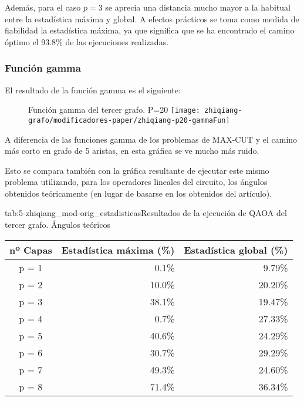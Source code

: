 Además, para el caso \(p = 3\) se aprecia una distancia mucho mayor a la habitual entre la estadística máxima y global. A efectos prácticos se toma como medida de fiabilidad la estadística máxima, ya que significa que se ha encontrado el camino óptimo el 93.8\% de las ejecuciones realizadas.

\subsubsection{Función gamma}

El resultado de la función gamma es el siguiente:

\begin{figure}[htbp]{}{Función gamma del tercer grafo. P=20}
  \centering
  \texttt{[image: zhiqiang-grafo/modificadores-paper/zhiqiang-p20-gammaFun]}
\end{figure}

A diferencia de las funciones gamma de los problemas de MAX-CUT y el camino más corto en grafo de 5 aristas, en esta gráfica se ve mucho más ruido.

Esto se compara también con la gráfica resultante de ejecutar este mismo problema utilizando, para los operadores lineales del circuito, los ángulos obtenidos teóricamente (en lugar de basarse en los obtenidos del artículo).

\begin{table}[htbp]{tab:5-zhiqiang_mod-orig_estadisticas}{Resultados de la ejecución de QAOA del tercer grafo. Ángulos teóricos}
  \centering
  \begin{tabular}{|c|r|r|}
    \hline
    \textbf{nº Capas} & \textbf{Estadística máxima (\%)} & \textbf{Estadística global (\%)} \\ \hline
    p = 1 &  0.1\% &  9.79\% \\ \hline
    p = 2 & 10.0\% & 20.20\% \\ \hline
    p = 3 & 38.1\% & 19.47\% \\ \hline
    p = 4 &  0.7\% & 27.33\% \\ \hline  %
    p = 5 & 40.6\% & 24.29\% \\ \hline
    p = 6 & 30.7\% & 29.29\% \\ \hline
    p = 7 & 49.3\% & 24.60\% \\ \hline
    p = 8 & 71.4\% & 36.34\% \\ \hline
  \end{tabular}
\end{table}

